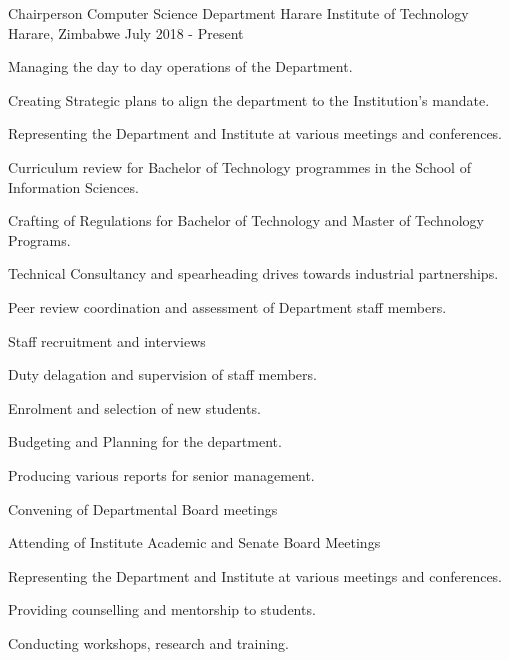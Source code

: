 

\begin{cventries}
 
  \cventry
    {Chairperson Computer Science Department} %
    {Harare Institute of Technology} %
    {Harare, Zimbabwe} %
    {July 2018 - Present} %
    {
      \begin{cvitems} %
        \item {Managing the day to day operations of the Department.}
        \item {Creating Strategic plans to align the department to the Institution’s mandate.}
        \item {Representing the Department and Institute at various meetings and conferences.}
        \item {Curriculum review for Bachelor of Technology programmes in the School of Information Sciences.}
        \item {Crafting of Regulations for Bachelor of Technology and Master of Technology Programs.}
        \item {Technical Consultancy and spearheading drives towards industrial partnerships.}
        \item {Peer review coordination and assessment of Department staff members.}
        \item {Staff recruitment and interviews}
        \item {Duty delagation and supervision of staff members.}
        \item {Enrolment and selection of new students.}
        \item {Budgeting and Planning for the department.}
        \item {Producing various reports for senior management.}
        \item {Convening of Departmental Board meetings}
        \item {Attending of Institute Academic and Senate Board Meetings}
        \item {Representing the Department and Institute at various meetings and conferences.}
        \item {Providing counselling and mentorship to students.}
        \item {Conducting workshops, research and training.}
      \end{cvitems}
    }




\end{cventries}
